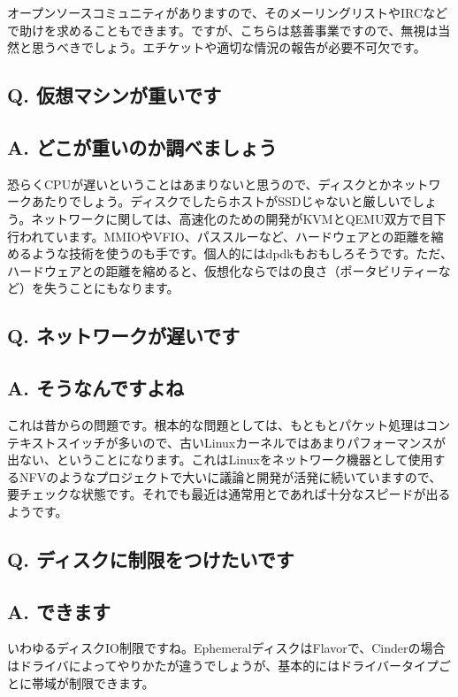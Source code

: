 \documentclass[9pt,b5paper,tombo,openany]{jsbook}
\begin{document}
オープンソースコミュニティがありますので、そのメーリングリストやIRCなどで助けを求めることもできます。ですが、こちらは慈善事業ですので、無視は当然と思うべきでしょう。エチケットや適切な情況の報告が必要不可欠です。

\subsection*{{\LARGE\bfseries Q.} 仮想マシンが重いです}
\subsection*{{\LARGE\bfseries A.} どこが重いのか調べましょう}
恐らくCPUが遅いということはあまりないと思うので、ディスクとかネットワークあたりでしょう。ディスクでしたらホストがSSDじゃないと厳しいでしょう。ネットワークに関しては、高速化のための開発がKVMとQEMU双方で目下行われています。MMIOやVFIO、パススルーなど、ハードウェアとの距離を縮めるような技術を使うのも手です。個人的にはdpdkもおもしろそうです。ただ、ハードウェアとの距離を縮めると、仮想化ならではの良さ（ポータビリティーなど）を失うことにもなります。

\subsection*{{\LARGE\bfseries Q.} ネットワークが遅いです}
\subsection*{{\LARGE\bfseries A.} そうなんですよね}
これは昔からの問題です。根本的な問題としては、もともとパケット処理はコンテキストスイッチが多いので、古いLinuxカーネルではあまりパフォーマンスが出ない、ということになります。これはLinuxをネットワーク機器として使用するNFVのようなプロジェクトで大いに議論と開発が活発に続いていますので、要チェックな状態です。それでも最近は通常用とであれば十分なスピードが出るようです。

\subsection*{{\LARGE\bfseries Q.} ディスクに制限をつけたいです}
\subsection*{{\LARGE\bfseries A.} できます}
いわゆるディスクIO制限ですね。EphemeralディスクはFlavorで、Cinderの場合はドライバによってやりかたが違うでしょうが、基本的にはドライバータイプごとに帯域が制限できます。
\end{document}
